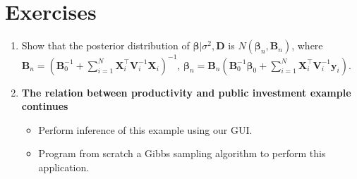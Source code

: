 \section{Exercises}\label{sec95}

\begin{enumerate}
	
	\item Show that the posterior distribution of $\bm{\beta}|\sigma^2,\bm{D}$ is $N(\bm{\beta}_n,\bm{B}_n)$, where $\bm{B}_n = (\bm{B}_0^{-1} +\sum_{i=1}^N \bm{X}_i^{\top}\bm{V}_i^{-1}\bm{X}_i)^{-1}$, $\bm{\beta}_n= \bm{B}_n(\bm{B}_0^{-1}\bm{\beta}_0 + \sum_{i=1}^N\bm{X}_i^{\top}\bm{V}_i^{-1}\bm{y}_i)$.
	
	\item \textbf{The relation between productivity and public investment example continues}
	
	\begin{itemize}
		\item Perform inference of this example using our GUI.
		\item Program from scratch a Gibbs sampling algorithm to perform this application. 
	\end{itemize} 
	
	
	
\end{enumerate}